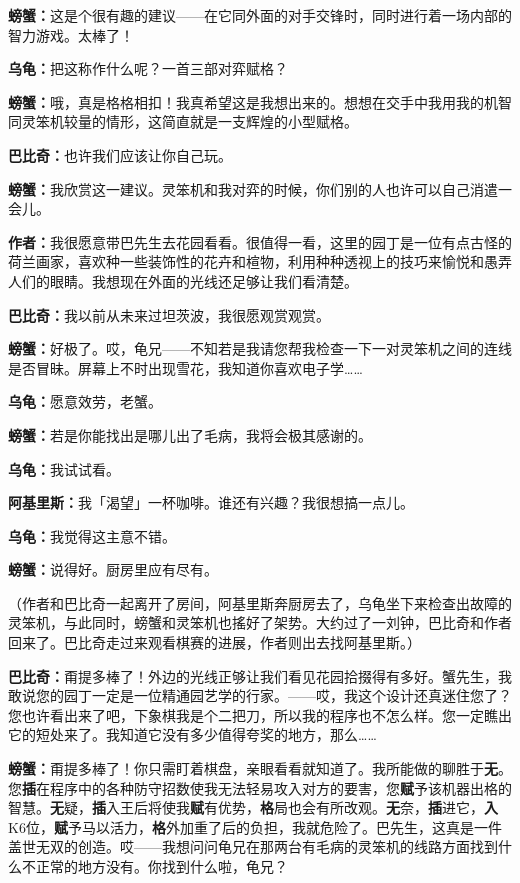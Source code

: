 \documentclass[
  12pt,
  twoside,
  openright,
  oldfontcommands,
]{memoir}
\newcommand{\heititext}[1]{{\heifamily\bfseries #1}}
\newcommand{\dialogname}[1]{{\heifamily\bfseries #1}}
\begin{document}
\dialogname{螃蟹：}这是个很有趣的建议------在它同外面的对手交锋时，同时进行着一场内部的智力游戏。太棒了！

\dialogname{乌龟：}把这称作什么呢？一首三部对弈赋格？

\dialogname{螃蟹：}哦，真是格格相扣！我真希望这是我想出来的。想想在交手中我用我的机智同灵笨机较量的情形，这简直就是一支辉煌的小型赋格。

\dialogname{巴比奇：}也许我们应该让你自己玩。

\dialogname{螃蟹：}我欣赏这一建议。灵笨机和我对弈的时候，你们别的人也许可以自己消遣一会儿。

\dialogname{作者：}我很愿意带巴先生去花园看看。很值得一看，这里的园丁是一位有点古怪的荷兰画家，喜欢种一些装饰性的花卉和楦物，利用种种透视上的技巧来愉悦和愚弄人们的眼睛。我想现在外面的光线还足够让我们看清楚。

\dialogname{巴比奇：}我以前从未来过坦茨波，我很愿观赏观赏。

\dialogname{螃蟹：}好极了。哎，龟兄------不知若是我请您帮我检查一下一对灵笨机之间的连线是否冒昧。屏幕上不时出现雪花，我知道你喜欢电子学\ldots\ldots{}

\dialogname{乌龟：}愿意效劳，老蟹。

\dialogname{螃蟹：}若是你能找出是哪儿出了毛病，我将会极其感谢的。

\dialogname{乌龟：}我试试看。

\dialogname{阿基里斯：}我「渴望」一杯咖啡。谁还有兴趣？我很想搞一点儿。

\dialogname{乌龟：}我觉得这主意不错。

\dialogname{螃蟹：}说得好。厨房里应有尽有。

（作者和巴比奇一起离开了房间，阿基里斯奔厨房去了，乌龟坐下来检查出故障的灵笨机，与此同时，螃蟹和灵笨机也搖好了架势。大约过了一刘钟，巴比奇和作者回来了。巴比奇走过来观看棋赛的进展，作者则出去找阿基里斯。）

\dialogname{巴比奇：}甭提多棒了！外边的光线正够让我们看见花园拾掇得有多好。蟹先生，我敢说您的园丁一定是一位精通园艺学的行家。------哎，我这个设计还真迷住您了？您也许看出来了吧，下象棋我是个二把刀，所以我的程序也不怎么样。您一定瞧出它的短处来了。我知道它没有多少值得夸奖的地方，那么\ldots\ldots{}

\dialogname{螃蟹：}甭提多棒了！你只需盯着棋盘，亲眼看看就知道了。我所能做的聊胜于\heititext{无}。您\heititext{插}在程序中的各种防守招数使我无法轻易攻入对方的要害，您\heititext{赋}予该机器出格的智慧。\heititext{无}疑，\heititext{插}入王后将使我\heititext{赋}有优势，\heititext{格}局也会有所改观。\heititext{无}奈，\heititext{插}进它，\heititext{入}K6位，\heititext{赋}予马以活力，\heititext{格}外加重了后的负担，我就危险了。巴先生，这真是一件盖世无双的创造。哎------我想问问龟兄在那两台有毛病的灵笨机的线路方面找到什么不正常的地方没有。你找到什么啦，龟兄？
\end{document}
